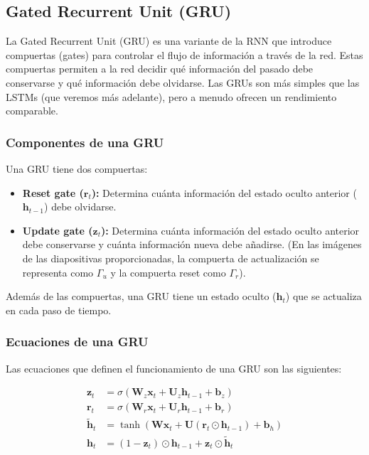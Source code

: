 \documentclass{article}
\begin{document}
\subsection{Gated Recurrent Unit (GRU)}

La Gated Recurrent Unit (GRU) es una variante de la RNN que introduce compuertas (gates) para controlar el flujo de información a través de la red.  Estas compuertas permiten a la red decidir qué información del pasado debe conservarse y qué información debe olvidarse.  Las GRUs son más simples que las LSTMs (que veremos más adelante), pero a menudo ofrecen un rendimiento comparable.

\subsubsection{Componentes de una GRU}
Una GRU tiene dos compuertas:

\begin{itemize}
    \item \textbf{Reset gate (\(\mathbf{r}_t\)):}  Determina cuánta información del estado oculto anterior (\(\mathbf{h}_{t-1}\)) debe olvidarse.
    \item \textbf{Update gate (\(\mathbf{z}_t\)):}  Determina cuánta información del estado oculto anterior debe conservarse y cuánta información nueva debe añadirse. (En las imágenes de las diapositivas proporcionadas, la compuerta de actualización se representa como \(\Gamma_u\) y la compuerta reset como \(\Gamma_r\)).
\end{itemize}

Además de las compuertas, una GRU tiene un estado oculto (\(\mathbf{h}_t\)) que se actualiza en cada paso de tiempo.

\subsubsection{Ecuaciones de una GRU}

Las ecuaciones que definen el funcionamiento de una GRU son las siguientes:

\begin{align*}
\mathbf{z}_t &= \sigma(\mathbf{W}_z \mathbf{x}_t + \mathbf{U}_z \mathbf{h}_{t-1} + \mathbf{b}_z) \\
\mathbf{r}_t &= \sigma(\mathbf{W}_r \mathbf{x}_t + \mathbf{U}_r \mathbf{h}_{t-1} + \mathbf{b}_r) \\
\tilde{\mathbf{h}}_t &= \tanh(\mathbf{W}\mathbf{x}_t + \mathbf{U}(\mathbf{r}_t \odot \mathbf{h}_{t-1}) + \mathbf{b}_h) \\
\mathbf{h}_t &= (1 - \mathbf{z}_t) \odot \mathbf{h}_{t-1} + \mathbf{z}_t \odot \tilde{\mathbf{h}}_t
\end{align*}
\end{document}
